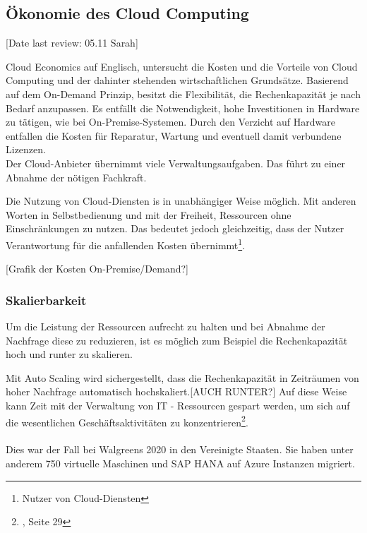 \subsection{Ökonomie des Cloud Computing}\label{subsec_UabsGrund3}
[Date last review: 05.11 Sarah]
\begin{flushleft}

      Cloud Economics auf Englisch, untersucht die Kosten und die Vorteile von Cloud Computing und der dahinter stehenden wirtschaftlichen Grundsätze. Basierend auf dem On-Demand Prinzip, besitzt die Flexibilität, die Rechenkapazität je nach Bedarf anzupassen.
      Es entfällt die Notwendigkeit, hohe Investitionen in Hardware zu tätigen, wie bei On-Premise-Systemen.
      Durch den Verzicht auf Hardware entfallen die Kosten für Reparatur, Wartung und eventuell damit verbundene Lizenzen.
      \\
      Der Cloud-Anbieter übernimmt viele Verwaltungsaufgaben. Das führt zu einer Abnahme der nötigen Fachkraft.
            {\cite{IDC01}}

      Die Nutzung von Cloud-Diensten is in unabhängiger Weise möglich.
      Mit anderen Worten in Selbstbedienung und mit der Freiheit, Ressourcen ohne Einschränkungen zu nutzen. Das bedeutet jedoch gleichzeitig, dass der Nutzer Verantwortung für die anfallenden Kosten übernimmt\footnote{Nutzer von Cloud-Diensten}.
\end{flushleft}

[Grafik der Kosten On-Premise/Demand?]
\subsubsection{Skalierbarkeit}
Um die Leistung der Ressourcen aufrecht zu halten und bei Abnahme der Nachfrage diese zu reduzieren,  ist es möglich zum Beispiel die Rechenkapazität hoch und runter zu skalieren.

Mit Auto Scaling wird sichergestellt, dass die Rechenkapazität in Zeiträumen von hoher Nachfrage automatisch hochskaliert.[AUCH RUNTER?]
Auf diese Weise kann Zeit mit der Verwaltung von IT - Ressourcen gespart werden, um sich auf die wesentlichen Geschäftsaktivitäten zu konzentrieren\footnote{{\cite{AWS1}}, Seite 29}.
\\\\
Dies war der Fall bei Walgreens 2020 in den Vereinigte Staaten.
Sie haben unter anderem 750 virtuelle Maschinen und SAP HANA auf Azure Instanzen migriert.

